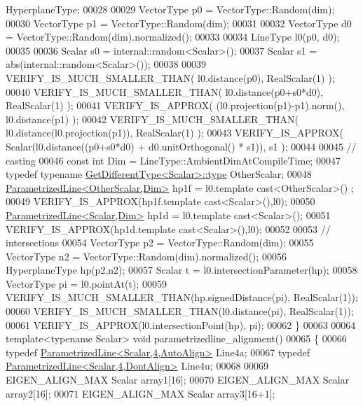 \begin{DoxyCode}
       HyperplaneType;
00028 
00029   VectorType p0 = VectorType::Random(dim);
00030   VectorType p1 = VectorType::Random(dim);
00031 
00032   VectorType d0 = VectorType::Random(dim).normalized();
00033 
00034   LineType l0(p0, d0);
00035 
00036   Scalar s0 = internal::random<Scalar>();
00037   Scalar s1 = abs(internal::random<Scalar>());
00038 
00039   VERIFY\_IS\_MUCH\_SMALLER\_THAN( l0.distance(p0), RealScalar(1) );
00040   VERIFY\_IS\_MUCH\_SMALLER\_THAN( l0.distance(p0+s0*d0), RealScalar(1) );
00041   VERIFY\_IS\_APPROX( (l0.projection(p1)-p1).norm(), l0.distance(p1) );
00042   VERIFY\_IS\_MUCH\_SMALLER\_THAN( l0.distance(l0.projection(p1)), RealScalar(1) );
00043   VERIFY\_IS\_APPROX( Scalar(l0.distance((p0+s0*d0) + d0.unitOrthogonal() * s1)), s1 );
00044 
00045   \textcolor{comment}{// casting}
00046   \textcolor{keyword}{const} \textcolor{keywordtype}{int} Dim = LineType::AmbientDimAtCompileTime;
00047   \textcolor{keyword}{typedef} \textcolor{keyword}{typename} \hyperlink{struct_get_different_type}{GetDifferentType<Scalar>::type} OtherScalar;
00048   \hyperlink{group___geometry___module_class_eigen_1_1_parametrized_line}{ParametrizedLine<OtherScalar,Dim>} hp1f = l0.template cast<OtherScalar>()
      ;
00049   VERIFY\_IS\_APPROX(hp1f.template cast<Scalar>(),l0);
00050   \hyperlink{group___geometry___module_class_eigen_1_1_parametrized_line}{ParametrizedLine<Scalar,Dim>} hp1d = l0.template cast<Scalar>();
00051   VERIFY\_IS\_APPROX(hp1d.template cast<Scalar>(),l0);
00052 
00053   \textcolor{comment}{// intersections}
00054   VectorType p2 = VectorType::Random(dim);
00055   VectorType n2 = VectorType::Random(dim).normalized();
00056   HyperplaneType hp(p2,n2);
00057   Scalar t = l0.intersectionParameter(hp);
00058   VectorType pi = l0.pointAt(t);
00059   VERIFY\_IS\_MUCH\_SMALLER\_THAN(hp.signedDistance(pi), RealScalar(1));
00060   VERIFY\_IS\_MUCH\_SMALLER\_THAN(l0.distance(pi), RealScalar(1));
00061   VERIFY\_IS\_APPROX(l0.intersectionPoint(hp), pi);
00062 \}
00063 
00064 \textcolor{keyword}{template}<\textcolor{keyword}{typename} Scalar> \textcolor{keywordtype}{void} parametrizedline\_alignment()
00065 \{
00066   \textcolor{keyword}{typedef} \hyperlink{group___geometry___module_class_eigen_1_1_parametrized_line}{ParametrizedLine<Scalar,4,AutoAlign>} Line4a;
00067   \textcolor{keyword}{typedef} \hyperlink{group___geometry___module_class_eigen_1_1_parametrized_line}{ParametrizedLine<Scalar,4,DontAlign>} Line4u;
00068 
00069   EIGEN\_ALIGN\_MAX Scalar array1[16];
00070   EIGEN\_ALIGN\_MAX Scalar array2[16];
00071   EIGEN\_ALIGN\_MAX Scalar array3[16+1];

\end{DoxyCode}
